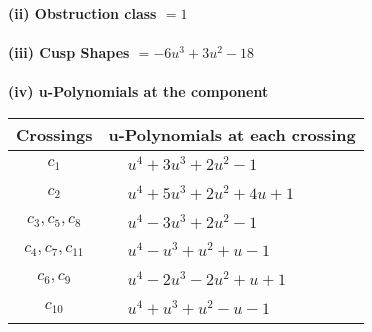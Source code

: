 \documentclass[1p]{elsarticle_modified}
\theoremstyle{definition}
\begin{document}
\flushleft \textbf{(ii) Obstruction class $= 1$}\\~\\
\flushleft \textbf{(iii) Cusp Shapes $= -6 u^3+3 u^2-18$}\\~\\
\newpage\renewcommand{\arraystretch}{1}
\flushleft \textbf{(iv) u-Polynomials at the component}\newline \\
\begin{tabular}{m{50pt}|m{274pt}}
Crossings & \hspace{64pt}u-Polynomials at each crossing \\
\hline $$\begin{aligned}c_{1}\end{aligned}$$&$\begin{aligned}
&u^4+3 u^3+2 u^2-1
\end{aligned}$\\
\hline $$\begin{aligned}c_{2}\end{aligned}$$&$\begin{aligned}
&u^4+5 u^3+2 u^2+4 u+1
\end{aligned}$\\
\hline $$\begin{aligned}c_{3},c_{5},c_{8}\end{aligned}$$&$\begin{aligned}
&u^4-3 u^3+2 u^2-1
\end{aligned}$\\
\hline $$\begin{aligned}c_{4},c_{7},c_{11}\end{aligned}$$&$\begin{aligned}
&u^4- u^3+u^2+u-1
\end{aligned}$\\
\hline $$\begin{aligned}c_{6},c_{9}\end{aligned}$$&$\begin{aligned}
&u^4-2 u^3-2 u^2+u+1
\end{aligned}$\\
\hline $$\begin{aligned}c_{10}\end{aligned}$$&$\begin{aligned}
&u^4+u^3+u^2- u-1
\end{aligned}$\\
\hline
\end{tabular}\\~\\
\end{document}
